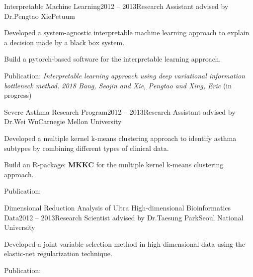\documentclass{tidycv} %
\begin{document}
\begin{cvresearches}
\begin{cvresearch}{Interpretable Machine Learning}{2012 -- 2013}{Research Assistant advised by Dr.\@ Pengtao Xie}{Petuum}
 \item Developed a system-agnostic interpretable machine learning approach to explain a decision made by a black box system.
 \item Build a pytorch-based software for the interpretable learning approach.
 \item Publication: \textit{Interpretable learning approach using deep variational information bottleneck method. 2018 Bang, Seojin and Xie, Pengtao and Xing, Eric} (in progress)
\end{cvresearch}
\begin{cvresearch}{Severe Asthma Research Program}{2012 -- 2013}{Research Assistant advised by Dr.\@ Wei Wu}{Carnegie Mellon University}
 \item Developed a multiple kernel k-means clustering approach to identify asthma subtypes by combining different types of clinical data.
 \item Build an R-package: {\bf MKKC} for the multiple kernel k-means clustering approach.
 \item Publication: \cite{wu2018asthma, bang2016naive}
\end{cvresearch}
\begin{cvresearch}{Dimensional Reduction Analysis of Ultra High-dimensional Bioinformatics Data}{2012 -- 2013}{Research Scientist advised by Dr.\@ Taesung Park}{Seoul National University}
 \item Developed a joint variable selection method in high-dimensional data using the elastic-net regularization technique.
 \item Publication: \cite{bang2012joint}
\end{cvresearch}

\end{cvresearches}
\end{document}
